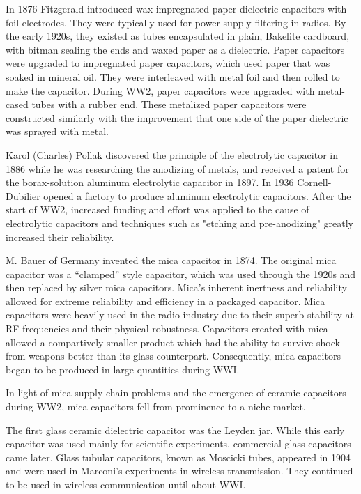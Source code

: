 In 1876 Fitzgerald introduced wax impregnated paper dielectric capacitors with foil electrodes.\cite[ch.~11]{dumInv} \cite{learn_caps} They were typically used for power supply filtering in radios. By the early 1920s, they existed as tubes encapsulated in plain, Bakelite cardboard, with bitman sealing the ends and waxed paper as a dielectric.\cite[ch~3]{dumInv}
Paper capacitors were upgraded to impregnated paper capacitors, which used paper that was soaked in mineral oil. They were interleaved with metal foil and then rolled to make the capacitor.\cite[ch.~8.2.1.1]{poorIntro} During WW2, paper capacitors were upgraded with metal-cased tubes with a rubber end.\cite[ch.~8.1]{poorIntro} These metalized paper capacitors were constructed similarly with the improvement that one side of the paper dielectric was sprayed with metal.\cite{hist_cerFilt}

Karol (Charles) Pollak discovered the principle of the electrolytic capacitor in 1886 while he was researching the anodizing of metals, and received a patent for the borax-solution aluminum electrolytic capacitor in 1897.  
In 1936 Cornell-Dubilier opened a factory to produce aluminum electrolytic capacitors. 
After the start of WW2, increased funding and effort was applied to the cause of electrolytic capacitors and techniques such as "etching and pre-anodizing" greatly increased their reliability.\cite{deis_hist}\cite{wiki_elec}

\nocite{hh}
\nocite{capGuide_mica}
M. Bauer of Germany invented the mica capacitor in 1874. The original mica capacitor was a ``clamped'' style capacitor, which was used through the 1920s\cite{wiki_mica} and then replaced by silver mica capacitors.\cite{learn_caps}
Mica's inherent inertness and reliability allowed for extreme reliability and efficiency in a packaged capacitor.\cite{tedds_mica} Mica capacitors were heavily used in the radio industry due to their superb stability at RF frequencies and their physical robustness.\cite{radio_mica}
Capacitors created with mica allowed a compartively smaller product\cite[f.~37-41]{dumInv} which had the ability to survive shock from weapons better than its glass counterpart. Consequently, mica capacitors began to be produced in large quantities during WWI.

In light of mica supply chain problems and the emergence of ceramic capacitors during WW2, mica capacitors fell from prominence to a niche market.\cite[Ch 3, Sec II]{cerMaterials}

The first glass ceramic dielectric capacitor was the Leyden jar. While this early capacitor was used mainly for scientific experiments, commercial glass capacitors came later. 
Glass tubular capacitors, known as Moscicki tubes, appeared in 1904 and were used in Marconi's experiments in wireless transmission. They continued to be used in wireless communication until about WWI. \cite[p.~102]{dumInv}

